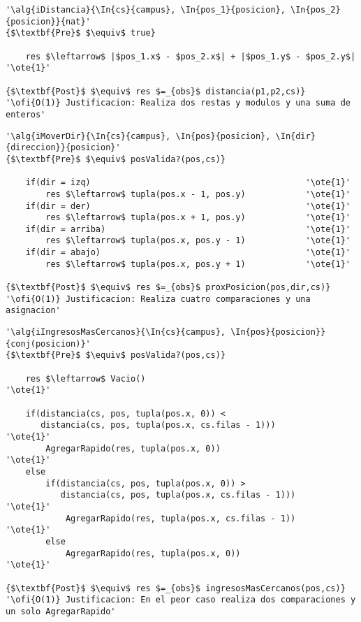 \begin{lstlisting}[mathescape]
'\alg{iDistancia}{\In{cs}{campus}, \In{pos_1}{posicion}, \In{pos_2}{posicion}}{nat}'
{$\textbf{Pre}$ $\equiv$ true}

	res $\leftarrow$ |$pos_1.x$ - $pos_2.x$| + |$pos_1.y$ - $pos_2.y$|	'\ote{1}'

{$\textbf{Post}$ $\equiv$ res $=_{obs}$ distancia(p1,p2,cs)}
'\ofi{O(1)} Justificacion: Realiza dos restas y modulos y una suma de enteros'
\end{lstlisting}

\begin{lstlisting}[mathescape]
'\alg{iMoverDir}{\In{cs}{campus}, \In{pos}{posicion}, \In{dir}{direccion}}{posicion}'
{$\textbf{Pre}$ $\equiv$ posValida?(pos,cs)}

	if(dir = izq)											'\ote{1}'
		res $\leftarrow$ tupla(pos.x - 1, pos.y)			'\ote{1}'
	if(dir = der)											'\ote{1}'
		res $\leftarrow$ tupla(pos.x + 1, pos.y)			'\ote{1}'
	if(dir = arriba)										'\ote{1}'
		res $\leftarrow$ tupla(pos.x, pos.y - 1)			'\ote{1}'
	if(dir = abajo)											'\ote{1}'
		res $\leftarrow$ tupla(pos.x, pos.y + 1)			'\ote{1}'

{$\textbf{Post}$ $\equiv$ res $=_{obs}$ proxPosicion(pos,dir,cs)}
'\ofi{O(1)} Justificacion: Realiza cuatro comparaciones y una asignacion'
\end{lstlisting}

\begin{lstlisting}[mathescape]
'\alg{iIngresosMasCercanos}{\In{cs}{campus}, \In{pos}{posicion}}{conj(posicion)}'
{$\textbf{Pre}$ $\equiv$ posValida?(pos,cs)}

	res $\leftarrow$ Vacio()										'\ote{1}'

	if(distancia(cs, pos, tupla(pos.x, 0)) < 
	   distancia(cs, pos, tupla(pos.x, cs.filas - 1))) 				'\ote{1}'
		AgregarRapido(res, tupla(pos.x, 0))							'\ote{1}'
	else
		if(distancia(cs, pos, tupla(pos.x, 0)) > 
		   distancia(cs, pos, tupla(pos.x, cs.filas - 1))) 			'\ote{1}'
			AgregarRapido(res, tupla(pos.x, cs.filas - 1))			'\ote{1}'
		else
			AgregarRapido(res, tupla(pos.x, 0))						'\ote{1}'

{$\textbf{Post}$ $\equiv$ res $=_{obs}$ ingresosMasCercanos(pos,cs)}
'\ofi{O(1)} Justificacion: En el peor caso realiza dos comparaciones y un solo AgregarRapido'
\end{lstlisting}